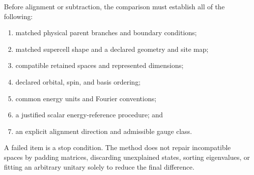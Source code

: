 Before alignment or subtraction, the comparison must establish all of the
following:
\begin{enumerate}
    \item matched physical parent branches and boundary conditions;
    \item matched supercell shape and a declared geometry and site map;
    \item compatible retained spaces and represented dimensions;
    \item declared orbital, spin, and basis ordering;
    \item common energy units and Fourier conventions;
    \item a justified scalar energy-reference procedure; and
    \item an explicit alignment direction and admissible gauge class.
\end{enumerate}
A failed item is a stop condition. The method does not repair incompatible
spaces by padding matrices, discarding unexplained states, sorting eigenvalues,
or fitting an arbitrary unitary solely to reduce the final difference.

